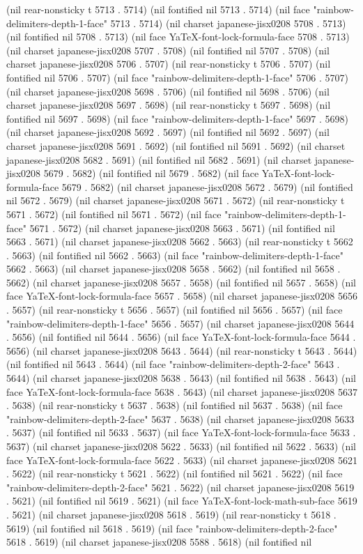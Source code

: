 (nil rear-nonsticky t 5713 . 5714) (nil fontified nil 5713 . 5714) (nil face "rainbow-delimiters-depth-1-face" 5713 . 5714) (nil charset japanese-jisx0208 5708 . 5713) (nil fontified nil 5708 . 5713) (nil face YaTeX-font-lock-formula-face 5708 . 5713) (nil charset japanese-jisx0208 5707 . 5708) (nil fontified nil 5707 . 5708) (nil charset japanese-jisx0208 5706 . 5707) (nil rear-nonsticky t 5706 . 5707) (nil fontified nil 5706 . 5707) (nil face "rainbow-delimiters-depth-1-face" 5706 . 5707) (nil charset japanese-jisx0208 5698 . 5706) (nil fontified nil 5698 . 5706) (nil charset japanese-jisx0208 5697 . 5698) (nil rear-nonsticky t 5697 . 5698) (nil fontified nil 5697 . 5698) (nil face "rainbow-delimiters-depth-1-face" 5697 . 5698) (nil charset japanese-jisx0208 5692 . 5697) (nil fontified nil 5692 . 5697) (nil charset japanese-jisx0208 5691 . 5692) (nil fontified nil 5691 . 5692) (nil charset japanese-jisx0208 5682 . 5691) (nil fontified nil 5682 . 5691) (nil charset japanese-jisx0208 5679 . 5682) (nil fontified nil 5679 . 5682) (nil face YaTeX-font-lock-formula-face 5679 . 5682) (nil charset japanese-jisx0208 5672 . 5679) (nil fontified nil 5672 . 5679) (nil charset japanese-jisx0208 5671 . 5672) (nil rear-nonsticky t 5671 . 5672) (nil fontified nil 5671 . 5672) (nil face "rainbow-delimiters-depth-1-face" 5671 . 5672) (nil charset japanese-jisx0208 5663 . 5671) (nil fontified nil 5663 . 5671) (nil charset japanese-jisx0208 5662 . 5663) (nil rear-nonsticky t 5662 . 5663) (nil fontified nil 5662 . 5663) (nil face "rainbow-delimiters-depth-1-face" 5662 . 5663) (nil charset japanese-jisx0208 5658 . 5662) (nil fontified nil 5658 . 5662) (nil charset japanese-jisx0208 5657 . 5658) (nil fontified nil 5657 . 5658) (nil face YaTeX-font-lock-formula-face 5657 . 5658) (nil charset japanese-jisx0208 5656 . 5657) (nil rear-nonsticky t 5656 . 5657) (nil fontified nil 5656 . 5657) (nil face "rainbow-delimiters-depth-1-face" 5656 . 5657) (nil charset japanese-jisx0208 5644 . 5656) (nil fontified nil 5644 . 5656) (nil face YaTeX-font-lock-formula-face 5644 . 5656) (nil charset japanese-jisx0208 5643 . 5644) (nil rear-nonsticky t 5643 . 5644) (nil fontified nil 5643 . 5644) (nil face "rainbow-delimiters-depth-2-face" 5643 . 5644) (nil charset japanese-jisx0208 5638 . 5643) (nil fontified nil 5638 . 5643) (nil face YaTeX-font-lock-formula-face 5638 . 5643) (nil charset japanese-jisx0208 5637 . 5638) (nil rear-nonsticky t 5637 . 5638) (nil fontified nil 5637 . 5638) (nil face "rainbow-delimiters-depth-2-face" 5637 . 5638) (nil charset japanese-jisx0208 5633 . 5637) (nil fontified nil 5633 . 5637) (nil face YaTeX-font-lock-formula-face 5633 . 5637) (nil charset japanese-jisx0208 5622 . 5633) (nil fontified nil 5622 . 5633) (nil face YaTeX-font-lock-formula-face 5622 . 5633) (nil charset japanese-jisx0208 5621 . 5622) (nil rear-nonsticky t 5621 . 5622) (nil fontified nil 5621 . 5622) (nil face "rainbow-delimiters-depth-2-face" 5621 . 5622) (nil charset japanese-jisx0208 5619 . 5621) (nil fontified nil 5619 . 5621) (nil face YaTeX-font-lock-math-sub-face 5619 . 5621) (nil charset japanese-jisx0208 5618 . 5619) (nil rear-nonsticky t 5618 . 5619) (nil fontified nil 5618 . 5619) (nil face "rainbow-delimiters-depth-2-face" 5618 . 5619) (nil charset japanese-jisx0208 5588 . 5618) (nil fontified nil 